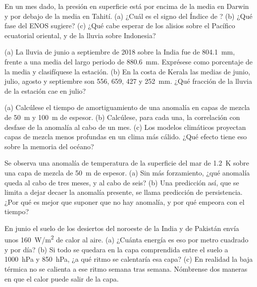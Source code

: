\begin{exercise}[$\star$]\label{exo:b2:climate-variability:3}
En un mes dado, la presión en superficie está por encima de la media en Darwin y por debajo de la media en Tahití.
(a) ¿Cuál es el signo del Índice de ? (b) ¿Qué fase del ENOS sugiere?
(c) ¿Qué cabe esperar de los alisios sobre el Pacífico ecuatorial oriental, y de la
lluvia sobre Indonesia?
\end{exercise}

\begin{exercise}[$\star$]\label{exo:b2:climate-variability:4}
(a) La lluvia de junio a septiembre de 2018 sobre la India fue de \qty{804.1}{mm}, frente a una
media del largo periodo de \qty{880.6}{mm}. Exprésese como porcentaje de la media y clasifíquese
la estación. (b) En la costa de Kerala las medias de junio, julio, agosto y septiembre son 556,
659, 427 y \qty{252}{mm}. ¿Qué fracción de la lluvia de la estación cae en julio?
\end{exercise}

\begin{exercise}[$\star\star$]\label{exo:b2:climate-variability:5}
(a) Calcúlese el tiempo de amortiguamiento de una anomalía en capas de mezcla de \qty{50}{m} y \qty{100}{m} de espesor.
(b) Calcúlese, para cada una, la correlación con desfase de la anomalía al cabo de un mes. (c) Los modelos climáticos
proyectan capas de mezcla menos profundas en un clima más cálido. ¿Qué efecto tiene eso sobre la memoria del
océano?
\end{exercise}

\begin{exercise}[$\star\star$]\label{exo:b2:climate-variability:6}
Se observa una anomalía de temperatura de la superficie del mar de \qty{+1.2}{K} sobre una capa de mezcla de \qty{50}{m}
de espesor. (a) Sin más forzamiento, ¿qué anomalía queda al cabo de tres meses, y al cabo de seis? (b)
Una predicción así, que se limita a dejar decaer la anomalía presente, se llama predicción de persistencia.
¿Por qué es mejor que suponer que no hay anomalía, y por qué empeora con el tiempo?
\end{exercise}

\begin{exercise}[$\star\star$]\label{exo:b2:climate-variability:7}
En junio el suelo de los desiertos del noroeste de la India y de Pakistán envía unos
\qty{160}{W/m^2} de calor al aire. (a) ¿Cuánta energía es eso por metro cuadrado y por día?
(b) Si todo se quedara en la capa comprendida entre el suelo a \qty{1000}{hPa} y \qty{850}{hPa}, ¿a qué
ritmo se calentaría esa capa? (c) En realidad la baja térmica no se calienta a ese ritmo semana tras semana.
Nómbrense dos maneras en que el calor puede salir de la capa.
\end{exercise}

